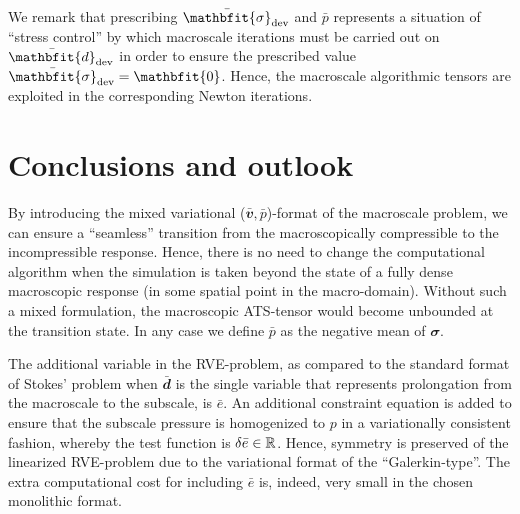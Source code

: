 \documentclass[12pt,review]{elsarticle}
\renewcommand{\ts}[1]{\mathbfit{#1}}
\newcommand{\figref}[1]{Figure~\ref{#1}}
\begin{document}

We remark that prescribing $\bar{\ts\sigma}_\dev$ and $\bar{p}$ represents a situation of ``stress control'' by which macroscale iterations must be carried out on $\bar{\ts d}_\dev$ in order to ensure the prescribed value $\bar{\ts\sigma}_\dev = \ts 0$.
Hence, the macroscale algorithmic tensors are exploited in the corresponding Newton iterations.

\section{Conclusions and outlook}\label{sec:conlusions}

By introducing the mixed variational ($\bar{\ts v},\bar{p}$)-format of the macroscale problem, we can ensure a ``seamless'' transition from the macroscopically compressible to the incompressible response.
Hence, there is no need to change the computational algorithm when the simulation is taken beyond the state of a fully dense macroscopic response (in some spatial point in the macro-domain).
Without such a mixed formulation, the macroscopic ATS-tensor would become unbounded at the transition state.
In any case we define $\bar{p}$ as the negative mean of $\ts\sigma$.

The additional variable in the RVE-problem, as compared to the standard format of Stokes' problem when $\bar{\ts d}$ is the single variable that represents prolongation from the macroscale to the subscale, is $\bar e$. An additional constraint equation is added to ensure that the subscale pressure is homogenized to $p$ in a variationally consistent fashion, whereby the test function is $\delta\bar e\in\mathbb{R}$.
Hence, symmetry is preserved of  the linearized RVE-problem due to the variational format of the ``Galerkin-type''.
The extra computational cost for including $\bar e$ is, indeed, very small in the chosen monolithic format.
\end{document}
